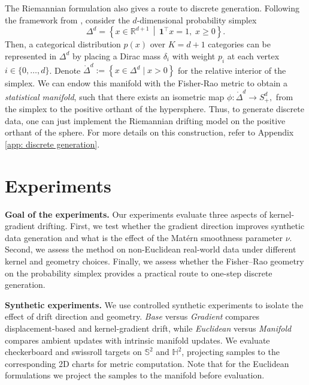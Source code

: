 \documentclass{article}
\theoremstyle{plain}
\begin{document}
The Riemannian formulation also gives a route to discrete generation. Following the framework from \citet{Davis_2024_Fisher}, consider the  $d$-dimensional probability simplex
\[
\Delta^d = \left\{ x \in \mathbb{R}^{d+1} \,\middle|\, \mathbf{1}^\top x = 1,\; x \geq 0 \right\}.
\]
Then, a categorical distribution $p(x)$ over $K = d+1$ categories can be represented in $\Delta^d$ by placing a Dirac mass $\delta_i$ with weight $p_i$ at each vertex $i \in \{0, \dots, d\}$. Denote  $
\mathring{\Delta}^d := \left\{ x \in \Delta^d \mid x > 0 \right\}$ for the relative interior of the simplex. We can endow this manifold with the Fisher-Rao metric to obtain a \textit{statistical manifold}, such that there exists an isometric map $\phi : \mathring{\Delta}^d \to S_+^d,$ from the simplex to the positive orthant of the hypersphere. Thus, to generate discrete data, one can just implement the Riemannian drifting model on the positive orthant of the sphere. For more details on this construction, refer to Appendix \ref{app: discrete generation}.


\section{Experiments}
\label{sec:experiments}

\textbf{Goal of the experiments.} Our experiments evaluate three aspects of kernel-gradient drifting. First, we test whether the gradient direction improves synthetic data generation and what is the effect of the Matérn smoothness parameter \(\nu\). Second, we assess the method on non-Euclidean real-world data under different kernel and geometry choices. Finally, we assess whether the Fisher--Rao geometry on the probability simplex provides a practical route to one-step discrete generation.


\textbf{Synthetic experiments.} We use controlled synthetic experiments to isolate the effect of drift direction and geometry. \emph{Base} versus \emph{Gradient} compares displacement-based and kernel-gradient drift, while \emph{Euclidean} versus \emph{Manifold} compares ambient updates with intrinsic manifold updates. We evaluate checkerboard and swissroll targets on \(\mathbb{S}^2\) and \(\mathbb{H}^2\), projecting samples to the corresponding 2D charts for metric computation. Note that for the Euclidean formulations we project the samples to the manifold before evaluation.
\end{document}
